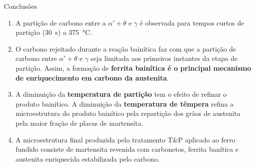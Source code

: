 \begin{frame}{Conclusões}
  \begin{enumerate}
    \conti

    \item A partição de carbono entre a $\alpha' + \theta$ e $\gamma$ é observada para tempos curtos de partição (30~s) a \SI{375}{\degreeCelsius}.

    \item O carbono rejeitado durante a reação bainítica faz com que a partição de carbono entre $\alpha' + \theta$ e $\gamma$ seja limitada aos primeiros instantes da etapa de partição. Assim, a formação de \textbf{ferrita bainítica é o principal mecanismo de enriquecimento em carbono da austenita}.

    \item A diminuição da \textbf{temperatura de partição} tem o efeito de refinar o produto bainítico. A diminuição da \textbf{temperatura de têmpera} refina a microestrutura do produto bainítico pela repartição dos grãos de austenita pela maior fração de placas de martensita.

    \item A microestrutura final produzida pelo tratamento T\&P aplicado ao ferro fundido consiste de martensita revenida com carbonetos, ferrita banítica e austenita enriquecida estabilizada pelo carbono.
  \end{enumerate}
\end{frame}


